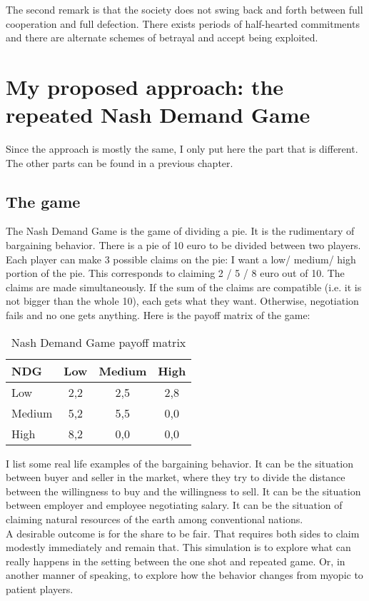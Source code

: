 \documentclass[12.5pt]{report}
\begin{document}
The second remark is that the society does not swing back and forth between full cooperation and full defection. There exists periods of half-hearted commitments and there are alternate schemes of betrayal and accept being exploited.


\chapter{My proposed approach: the repeated Nash Demand Game}

Since the approach is mostly the same, I only put here the part that is different. The other parts can be found in a previous chapter.

\section{The game}

The Nash Demand Game is the game of dividing a pie. It is the rudimentary of bargaining behavior. There is a pie of 10 euro to be divided between two players. Each player can make 3 possible claims on the pie: I want a low/ medium/ high portion of the pie. This corresponds to claiming 2 / 5 / 8 euro out of 10. The claims are made simultaneously. If the sum of the claims are compatible (i.e. it is not bigger than the whole 10), each gets what they want. Otherwise, negotiation fails and no one gets anything. Here is the payoff matrix of the game:

\begin{table}[h!]
\center
\begin{tabular}{l|ccc}
\textbf{NDG}&Low& Medium&High\\
\hline
Low & 2,2 & 2,5& 2,8\\
Medium & 5,2 & 5,5 &0,0\\
High & 8,2&0,0&0,0\\
\end{tabular}
\caption{Nash Demand Game payoff matrix}
\end{table}

I list some real life examples of the bargaining behavior. It can be the situation between buyer and seller in the market, where they try to divide the distance between the willingness to buy and the willingness to sell. It can be the situation between employer and employee negotiating salary. It can be the situation of claiming natural resources of the earth among conventional nations.\\

A desirable outcome is for the share to be fair. That requires both sides to claim modestly immediately and remain that. This simulation is to explore what can really happens in the setting between the one shot and repeated game. Or, in another manner of speaking, to explore how the behavior changes from myopic to patient players.\\
\end{document}
